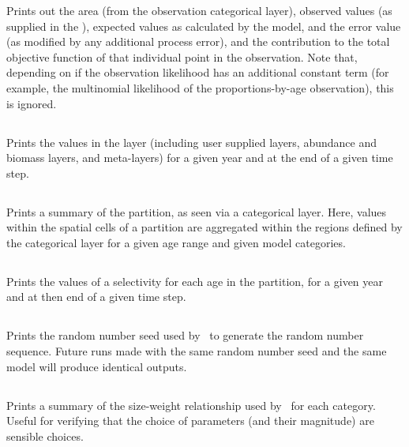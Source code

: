 Prints out the area (from the observation categorical layer), observed values (as supplied in the \config), expected values as calculated by the model, and the error value (as modified by any additional process error), and the contribution to the total objective function of that individual point in the observation. Note that, depending on if the observation likelihood has an additional constant term (for example, the multinomial likelihood of the proportions-by-age observation), this is ignored. 

\subsection{}

Prints the values in the layer (including user supplied layers, abundance and biomass layers, and meta-layers) for a given year and at the end of a given time step. 

\subsection{}

Prints a summary of the partition, as seen via a categorical layer. Here, values within the spatial cells of a partition are aggregated within the regions defined by the categorical layer for a given age range and given model categories.

\subsection{}

Prints the values of a selectivity for each age in the partition, for a given year and at then end of a given time step.

\subsection{}

Prints the random number seed used by \SPM\ to generate the random number sequence. Future runs made with the same random number seed and the same model will produce identical outputs.

\subsection{\label{sec:report-weight-at-size}}

Prints a summary of the  size-weight relationship used by \SPM\ for each category. Useful for verifying that the choice of parameters (and their magnitude) are sensible choices.

